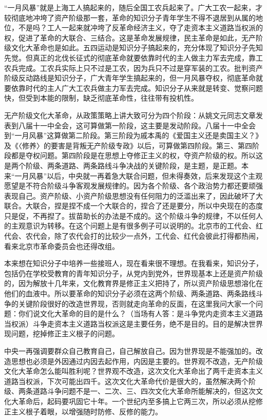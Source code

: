 “一月风暴”就是上海工人搞起来的，随后全国工农兵起来了。广大工农一起来，才较彻底地冲垮了资产阶级那一套，革命的知识分子青年学生不得不退居到从属的地位，不是吗？工人一起来就冲垮了反革命经济主义，夺了走资本主义道路当权派的权，促进了革命的大联合、三结合。这是革命发展规律，民主革命是如此，无产阶级文化大革命也是如此。五四运动是知识分子搞起来的，充分体现了知识分子先知先觉。但真正的北伐长征式的彻底革命就要依靠时代的主人做主力军去完成，靠工农兵完成。工农兵实际上只不过是工农，因为兵只不过是穿军装的工农。批判资产阶级反动路线是知识分子，广大青年学生搞起来的，但一月风暴夺权，彻底革命就要依靠时代的主人广大工农兵做主力军去完成。知识分子从来就是转变、觉察问题快，但受到本能的限制，缺乏彻底革命性，往往带有投机性。

无产阶级文化大革命，从政策策略上讲大致可分为四个阶段：从姚文元同志文章发表到八届十一中全会，这可算做第一阶段，这主要是发动阶段。八届十一中全会到“一月风暴”这算做第二阶段。第三阶段为戚本禹的《爱国主义还是卖国主义？》及《〈修养〉的要害是背叛无产阶级专政》以后，可算做第四阶段。第三、第四阶段都是夺权问题。第四阶段是在思想上夺修正主义的权，夺资产阶级的权。所以这是两个阶级、两条道路、两条路线斗争决战的关键阶段，是主题，是正题。本来“一月风暴”以后，中央就一再着急大联合问题，但未得奏效，后来发现这个主观愿望是不符合阶级斗争客观发展规律的。因为各个阶级、各个政治势力都还要顽强表现自己。资产阶级、小资产阶级思想没有任何阻力的泛滥出来了，因此破坏了大联合。大联合，捏是捏不成一个大联合的，捏合了还是要分，所以中央现在的态度只是促，不再揑了。拔苗助长的办法是不成的。这个阶级斗争的规律，不以任何人的主观意识为转移。在这个问题上是有很多例子可以说明的。北京市的工代会、红代会、农代会，除了农代会打的比较少一点外，工代会、红代会彼此打得都热闹，看来北京市革命委员会也还得改组。

本来想在知识分子中培养一些接班人，现在看来很不理想。在我看来，知识分子，包括仍在学校受教育的青年知识分子，从党内到党外，世界现基本上还是资产阶级的，因为解放十几年来，文化教育界是修正主义把持了，所以资产阶级思想溶化在他们的血液中。所以要革命的知识分子必须在这两个阶级、两条道路、两条路线斗争的关键阶段很好的改造世界现，否则就走向革命的反面，在这里我问大家一个问题：你们说文化大革命的目的是什么？（当场有人答：是斗争党内走资本主义道路当权派）斗争走资本主义道路当权派这是主要任务，绝不是目的。目的是解决世界现问题，挖掉修正主义根子的问题。

中央一再强调要群众自己教育自己，自己解放自己。因为世界现是不能强加的。改造思想也必须是外因通过内因去起作用，内因是主要的。世界观不改造，无产阶级文化大革命怎么能叫胜利呢？世界观不改造，这次文化大革命出了两千走资本主义道路当权派，下次可能出四千。这次文化大革命代价是很大的，虽然解决两个阶级、两条道路斗争问题不是一、二次、三、四次文化大革命所能解决的，但这次文化大革命后，起码要巩固它十年。一个世纪内至多搞上它两三次，所以必须从挖修正主义根子着眼，以增强随时防修、反修的能力。

